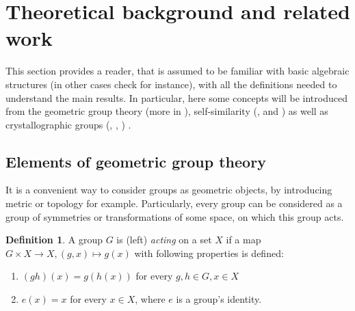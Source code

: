 \documentclass[a4paper,12pt]{amsart}
\theoremstyle{definition}
\newtheorem{definition}{Definition}
\begin{document}
		
		
	
	
	\newpage 
	\section{Theoretical background and related work}\label{section: theory}
	This section provides a reader, that is assumed to be familiar with basic algebraic structures (in other cases check \cite{Algebra} for instance), with all the definitions needed to understand the main results. In particular, here some concepts will be introduced from the  geometric group theory (more in \cite{GeomAlgebra:Bondarenko}), self-similarity (\cite{Nekrashevych:self-similar}, \cite{Nekrashevych:virtual_endomorphisms} and \cite{Auto}) as well as crystallographic groups (\cite{Cryst_and_math}, \cite{cryst:group_theory}, \cite{cryst:geometry_of_cryst}) .
	
	\subsection{Elements of geometric group theory}
	It is a convenient way to consider groups as geometric objects, by introducing metric or topology for example. Particularly, every group can be considered as a group of symmetries or transformations of some space, on which this group acts. 
	
	\begin{definition}
		A group $G$ is (left) \textit{acting} on a set $X$ if a map $G \times X \rightarrow X, (g, x) \mapsto g(x)$ with following properties is defined: 
		
		\begin{enumerate}[label=\arabic*.]
			\item $(gh)(x) = g(h(x))$ for every $g, h \in G, x \in X$
			\item $e(x) = x$ for every $x \in X$, where $e$ is a group's identity.
			
		\end{enumerate}
		
	\end{definition}
	
\end{document}

